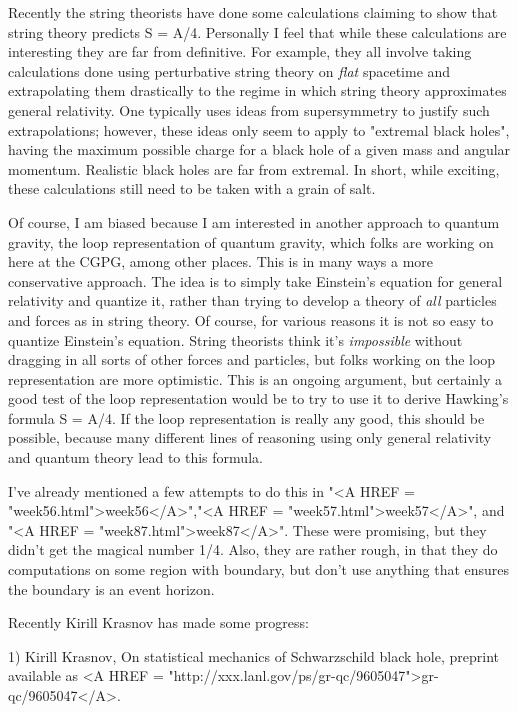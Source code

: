 Recently the string theorists have done some calculations claiming to
show that string theory predicts S = A/4.  Personally I feel that
while these calculations are interesting they are far from definitive.
For example, they all involve taking calculations done using
perturbative string theory on \emph{flat} spacetime and extrapolating them
drastically to the regime in which string theory approximates general
relativity.  One typically uses ideas from supersymmetry to justify
such extrapolations; however, these ideas only seem to apply to
"extremal black holes", having the maximum possible charge for a black
hole of a given mass and angular momentum.  Realistic black holes are
far from extremal.  In short, while exciting, these calculations
still need to be taken with a grain of salt.  

Of course, I am biased because I am interested in another approach to
quantum gravity, the loop representation of quantum gravity, which
folks are working on here at the CGPG, among other places.  This is in
many ways a more conservative approach.  The idea is to simply take
Einstein's equation for general relativity and quantize it, rather
than trying to develop a theory of \emph{all} particles and forces as in
string theory.  Of course, for various reasons it is not so easy to
quantize Einstein's equation.  String theorists think it's
\emph{impossible} without dragging in all sorts of other forces and
particles, but folks working on the loop representation are more
optimistic.  This is an ongoing argument, but certainly a good test of
the loop representation would be to try to use it to derive Hawking's
formula S = A/4.  If the loop representation is really any good, this
should be possible, because many different lines of reasoning using
only general relativity and quantum theory lead to this formula.

I've already mentioned a few attempts to do this in "<A HREF = "week56.html">week56</A>","<A HREF = "week57.html">week57</A>", 
and "<A HREF = "week87.html">week87</A>".  These were promising, but they didn't get the magical
number 1/4.   Also, they are rather rough, in that they do computations
on some region with boundary, but don't use anything that ensures
the boundary is an event horizon.  

Recently Kirill Krasnov has made some progress:

1) Kirill Krasnov, On statistical mechanics of Schwarzschild black
hole, preprint available as <A HREF = "http://xxx.lanl.gov/ps/gr-qc/9605047">gr-qc/9605047</A>.

